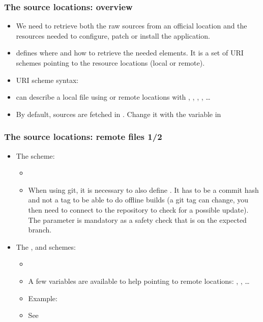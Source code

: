 \begin{frame}
  \frametitle{The source locations: overview}
  \begin{itemize}
    \item We need to retrieve both the raw sources from an official
      location and the resources needed to configure, patch or install
      the application.
    \item {} defines where and how to retrieve the
      needed elements. It is a set of URI schemes pointing to the
      resource locations (local or remote).
    \item URI scheme syntax: 
    \item {} can describe a local file using 
      or remote locations with , ,
      , , \dots
    \item By default, sources are fetched in
      . Change it with the 
      variable in 
  \end{itemize}
\end{frame}

\begin{frame}
  \frametitle{The source locations: remote files 1/2}
  \begin{itemize}
    \item The  scheme:
      \begin{itemize}
        \item {}
        \item When using git, it is necessary to also define
          . It has to be a commit hash and not a tag to
          be able to do offline builds (a git tag can change, you then need
	  to connect to the repository to check for a possible update).
          The  parameter is mandatory as a safety check
          that  is on the expected branch.
      \end{itemize}
    \item The ,  and  schemes:
      \begin{itemize}
        \item {}
        \item A few variables are available to help pointing to remote
          locations: ,
          , \dots
        \item Example:
        \item See 
      \end{itemize}
  \end{itemize}
\end{frame}

